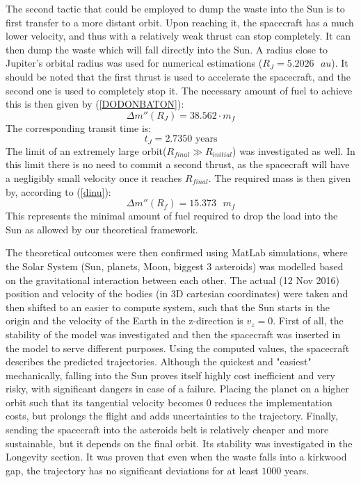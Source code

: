 \documentclass[onecolumn,12pt]{article}
\numberwithin{equation}{section}
\begin{document}
The second tactic that could be employed to dump the waste into the Sun is to first transfer to a more distant orbit. Upon reaching it, the spacecraft has a much lower velocity, and thus with a relatively weak thrust can stop completely. It can then dump the waste which will fall directly into the Sun. A radius close to Jupiter's orbital radius was used for numerical estimations ($R_J = 5.2026 \text{ }au$). It should be noted that the first thrust is used to accelerate the spacecraft, and the second one is used to completely stop it. The necessary amount of fuel to achieve this is then given by (\ref{DODONBATON}):
\begin{equation*}
    \Delta m'' (R_J) = 38.562 \cdot m_f
\end{equation*}
The corresponding transit time is:
\begin{equation*}
    t_{J} = 2.7350 \text{ years}
\end{equation*}
The limit of an extremely large orbit($R_{final} \gg R_{initial}$) was investigated as well. In this limit there is no need to commit a second thrust, as the spacecraft will have a negligibly small velocity once it reaches $R_{final}$. The required mass is then given by, according to (\ref{dinu}):
\begin{equation*}
    \Delta m'' (R_f) = 15.373 \text{ }m_f
\end{equation*}
This represents the minimal amount of fuel required to drop the load into the Sun as allowed by our theoretical framework.

The theoretical outcomes were then confirmed using MatLab simulations, where the Solar System (Sun, planets, Moon, biggest 3 asteroids) was modelled based on the gravitational interaction between each other. The actual (12 Nov 2016) position and velocity of the bodies (in 3D cartesian coordinates) were taken and then shifted to an easier to compute system, such that the Sun starts in the origin and the velocity of the Earth in the z-direction is $v_z=0$. First of all, the stability of the model was investigated and then the spacecraft was inserted in the model to serve different purposes. Using the computed values, the spacecraft describes the predicted trajectories. Although the quickest and "easiest" mechanically, falling into the Sun proves itself highly cost inefficient and very risky, with significant dangers in case of a failure. Placing the planet on a higher orbit such that its tangential velocity becomes 0 reduces the implementation costs, but prolongs the flight and adds uncertainties to the trajectory. Finally, sending the spacecraft into the asteroids belt is relatively cheaper and more sustainable, but it depends on the final orbit. Its stability was investigated in the Longevity section. It was proven that even when the waste falls into a kirkwood gap, the trajectory has no significant deviations for at least $1000$ years.
\end{document}
